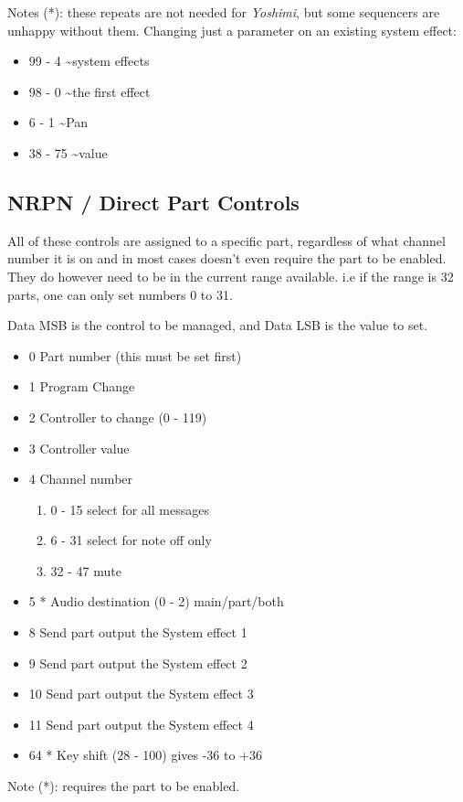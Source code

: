    Notes (*): these repeats are not needed for \textsl{Yoshimi},
   but some sequencers are unhappy without them.
   Changing just a parameter on an existing system effect:

   \begin{itemize}
      \item 99 -   4 \textasciitilde system effects
      \item 98 -   0 \textasciitilde the first effect
      \item 6 -   1 \textasciitilde Pan
      \item 38 -  75 \textasciitilde value
   \end{itemize}


\subsection{NRPN / Direct Part Controls}
\label{subsection:nrpns_direct_part_control}
   All of these controls are assigned to a specific part, regardless of
   what channel number it is on and in most cases doesn't even require the
   part to be enabled. They do however need to be in the current range
   available. i.e if the range is 32 parts, one can only set numbers 0 to
   31.

   Data MSB is the control to be managed, and Data LSB is the value to set.

   \begin{itemize}
      \item 0 \hspace{8pt}Part number (this must be set first)
      \item 1 \hspace{8pt}Program Change
      \item 2 \hspace{8pt}Controller to change (0 - 119)
      \item 3 \hspace{8pt}Controller value
      \item 4 \hspace{8pt}Channel number
      \begin{enumerate}[label=\alph*)]
          \item 0 - 15 select for all messages
          \item 6 - 31 select for note off only
          \item 32 - 47 mute
      \end{enumerate}
      \item 5 * Audio destination (0 - 2) main/part/both
      \item 8 \hspace{8pt}Send part output the System effect 1
      \item 9 \hspace{8pt}Send part output the System effect 2
      \item 10 \hspace{8pt}Send part output the System effect 3
      \item 11 \hspace{8pt}Send part output the System effect 4
      \item 64 * Key shift (28 - 100) gives -36 to +36
   \end{itemize}
   Note (*): requires the part to be enabled.
